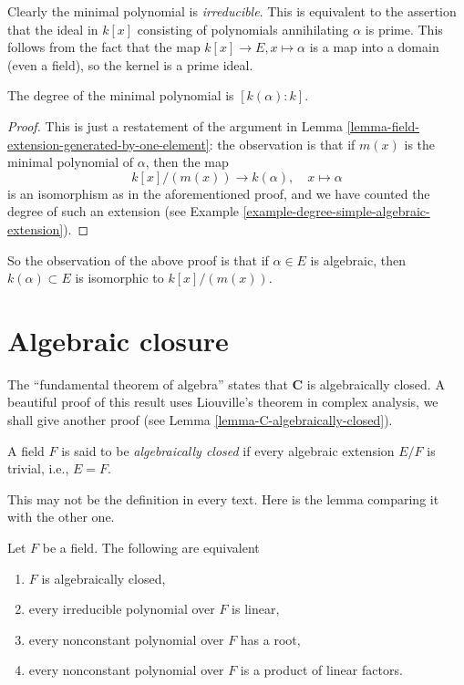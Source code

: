 \medskip\noindent
Clearly the minimal polynomial is {\it irreducible}. This is equivalent to the
assertion that the ideal in $k[x]$ consisting of polynomials annihilating
$\alpha$ is prime. This follows from the fact that the map
$k[x] \to E, x \mapsto \alpha$ is a map into a domain (even a field), so the
kernel is a prime ideal.

\begin{lemma}
\label{lemma-degree-minimal-polynomial}
The degree of the minimal polynomial is $[k(\alpha):k]$.
\end{lemma}

\begin{proof}
This is just a restatement of the argument in
Lemma \ref{lemma-field-extension-generated-by-one-element}: the observation
is that if $m(x)$ is the minimal polynomial of $\alpha$, then the map
$$
k[x]/(m(x)) \to k(\alpha), \quad x \mapsto \alpha
$$
is an isomorphism as in the aforementioned proof, and we have counted the
degree of such an extension (see
Example \ref{example-degree-simple-algebraic-extension}).
\end{proof}

\noindent
So the observation of the above proof is that if $\alpha \in E$ is algebraic,
then $k(\alpha) \subset E$ is isomorphic to $k[x]/(m(x))$.


\section{Algebraic closure}
\label{section-algebraic-closure}

\noindent
The ``fundamental theorem of algebra'' states that $\mathbf{C}$ is
algebraically closed. A beautiful proof of this result uses
Liouville's theorem in complex analysis, we shall give another
proof (see Lemma \ref{lemma-C-algebraically-closed}).

\begin{definition}
\label{definition-algebraically-closed}
A field $F$ is said to be {\it algebraically closed} if every algebraic
extension $E/F$ is trivial, i.e., $E = F$.
\end{definition}

\noindent
This may not be the definition in every text. Here is the lemma comparing
it with the other one.

\begin{lemma}
\label{lemma-algebraically-closed}
Let $F$ be a field. The following are equivalent
\begin{enumerate}
\item $F$ is algebraically closed,
\item every irreducible polynomial over $F$ is linear,
\item every nonconstant polynomial over $F$ has a root,
\item every nonconstant polynomial over $F$ is a product of linear factors.
\end{enumerate}
\end{lemma}

